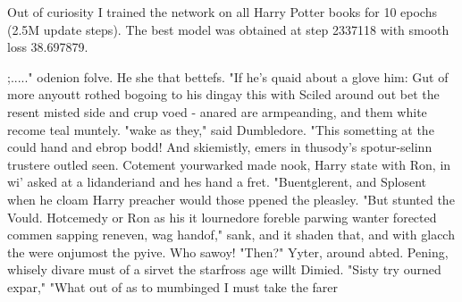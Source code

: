 \vspace{1em}
Out of curiosity I trained the network on all Harry Potter books for 10 epochs (2.5M update steps). The best model was obtained at step 2337118 with smooth loss 38.697879.
\begin{spverbatim}
;....." odenion folve. He she that bettefs. "If he's quaid about a glove him: Gut of more anyoutt rothed bogoing to his dingay this with Sciled around out bet the resent misted side and crup voed - anared are armpeanding, and them white recome teal muntely. "wake as they," said Dumbledore. "This sometting at the could hand and ebrop bodd! And skiemistly, emers in thusody’s spotur-selinn trustere outled seen.
Cotement yourwarked made nook, Harry state with Ron, in wi’ asked at a lidanderiand and hes hand a fret.
"Buentglerent, and Splosent when he cloam Harry preacher would those ppened the pleasley. "But stunted the Vould. Hotcemedy or Ron as his it lournedore foreble parwing wanter forected commen sapping reneven, wag handof," sank, and it shaden that, and with glacch the were onjumost the pyive. Who sawoy! "Then?" Yyter, around abted. Pening, whisely divare must of a sirvet the starfross age willt Dimied.
"Sisty try ourned expar,"
"What out of as to mumbinged I must take the farer
\end{spverbatim}